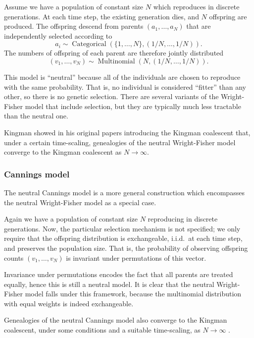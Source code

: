 \documentclass[fleqn]{article}
\theoremstyle{definition}
\newcommand{\Cat}{\operatorname{Categorical}}
\newcommand{\Mn}{\operatorname{Multinomial}}
\begin{document}
Assume we have a population of constant size $N$ which reproduces in discrete generations.
At each time step, the existing generation dies, and $N$ offspring are produced. The offspring descend from parents $(a_1, \dots, a_N)$ that are independently selected according to
\begin{equation*}
a_i \sim \Cat(\{1, \dots, N\}, (1/N, \dots, 1/N)).
\end{equation*}
The numbers of offspring of each parent are therefore jointly distributed
\begin{equation*}
(v_1,\dots, v_N) \sim \Mn(N, (1/N, \dots, 1/N)).
\end{equation*}

This model is ``neutral'' because all of the individuals are chosen to reproduce with the same probability. That is, no individual is considered ``fitter'' than any other, so there is no genetic selection. There are several variants of the Wright-Fisher model that include selection, but they are typically much less tractable than the neutral one.

Kingman showed in his original papers introducing the Kingman coalescent \citep{kingman1982gene} that, under a certain time-scaling, genealogies of the neutral Wright-Fisher model converge to the Kingman coalescent as $N\to\infty$.

\subsubsection{Cannings model}
The neutral Cannings model \citep{cannings1974, cannings1975} is a more general construction which encompasses the neutral Wright-Fisher model as a special case.

Again we have a population of constant size $N$ reproducing in discrete generations.
Now, the particular selection mechanism is not specified; we only require that the offspring distribution is exchangeable, i.i.d.\ at each time step, and preserves the population size. That is, the probability of observing offspring counts $(v_1, \dots, v_N)$ is invariant under permutations of this vector.

Invariance under permutations encodes the fact that all parents are treated equally, hence this is still a neutral model.
It is clear that the neutral Wright-Fisher model falls under this framework, because the multinomial distribution with equal weights is indeed exchangeable.

Genealogies of the neutral Cannings model also converge to the Kingman coalescent, under some conditions and a suitable time-scaling, as $N\to\infty$ \citep[Section 2.2]{etheridge2011}.
\end{document}
